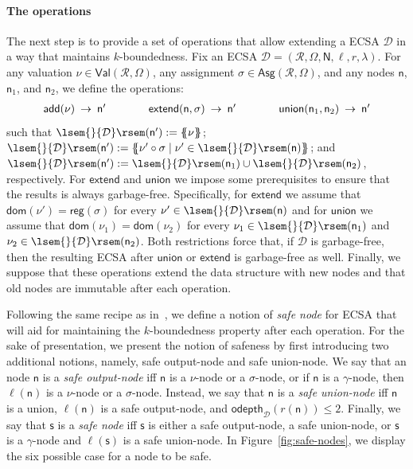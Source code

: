 \documentclass[
a4paper
]{article}
\theoremstyle{plain}
\theoremstyle{definition}
\theoremstyle{remark}
\newcommand{\dom}{\operatorname{dom}}
\newcommand{\Reg}{\mathcal{R}}
\newcommand{\Asg}{\operatorname{Asg}}
\newcommand{\Val}{\operatorname{Val}}
\newcommand{\reg}{\operatorname{reg}}
\newcommand{\D}{\mathcal{D}}
\newcommand{\n}{\textsf{n}}
\newcommand{\s}{\textsf{s}}
\newcommand{\N}{\textsf{N}}
\newcommand{\odepth}{\operatorname{odepth}}
\newcommand{\dadd}{\operatorname{add}}
\newcommand{\dunion}{\operatorname{union}}
\newcommand{\dextend}{\operatorname{extend}}
\newcommand{\sem}[1]{{\lsem{}{#1}\rsem}}
\newcommand{\multiset}[1]{\{\!\!\{#1\}\!\!\}}
\renewcommand{\operatorname}[1]{\textsf{#1}}
\begin{document}
\paragraph{The operations} The next step is to provide a set of operations that allow extending a ECSA $\D$ in a way that maintains $k$-boundedness. Fix an ECSA $\D = (\Reg, \Omega, \N, \ell, r, \lambda)$. For any valuation $\nu \in \Val(\Reg, \Omega)$, any assignment $\sigma \in \Asg(\Reg,\Omega)$, and any nodes $\n$, $\n_1$, and $\n_2$, we define the operations:
\[
\begin{array}{rclrclrcl}
	\dadd(\nu) \! \! \! &\to&\! \! \! \n'  \text{\hspace{1cm}} & \dextend(\n, \sigma) \! \! \! &\to&\! \! \! \n' &  \text{\hspace{1cm}}  \dunion(\n_1, \n_2) \! \! \! &\to&\! \! \! \n' 
\end{array}
\]
such that $\sem{\D}(\n') := \multiset{\nu}$; $\sem{\D}(\n') := \multiset{\nu' \circ \sigma \mid \nu' \in \sem{\D}(\n)}$; and $\sem{\D}(\n') := \sem{\D}(\n_1) \cup \sem{\D}(\n_2)$, respectively.
For $\dextend$ and $\dunion$ we impose some prerequisites to ensure that the results is always garbage-free. Specifically, for $\dextend$ we assume that $\dom(\nu') = \reg(\sigma)$ for every $\nu' \in \sem{\D}(\n)$ and for $\dunion$ we assume that $\dom(\nu_1) = \dom(\nu_2)$ for every $\nu_1 \in \sem{\D}(\n_1)$ and $\nu_2 \in \sem{\D}(\n_2)$.
Both restrictions force that, if $\D$ is garbage-free, then the resulting ECSA after $\dunion$ or $\dextend$ is garbage-free as well. 
Finally, we suppose that these operations extend the data structure with new nodes and that old nodes are immutable after each operation. 

Following the same recipe as in~\cite{MunozR22}, we define a notion of \emph{safe node} for ECSA that will aid for maintaining the $k$-boundedness property after each operation.
For the sake of presentation, we present the notion of safeness by first introducing two additional notions, namely, safe output-node and safe union-node. 
We say that an node $\n$ is a \emph{safe output-node} iff $\n$ is a $\nu$-node or a $\sigma$-node, or if $\n$ is a $\gamma$-node, then $\ell(\n)$ is a $\nu$-node or a $\sigma$-node. 
Instead, we say that $\n$ is a \emph{safe union-node}
iff $\n$ is a union, $\ell(\n)$ is a safe output-node, and $\odepth_{\D}(r(\n)) \leq 2$. 
Finally, we say that $\s$ is a \emph{safe node} iff $\s$ is either a safe output-node, a safe union-node, or $\s$ is a $\gamma$-node and $\ell(\s)$ is a safe union-node. 
In Figure~\ref{fig:safe-nodes}, we display the six possible case for a node to be safe. 
\end{document}
